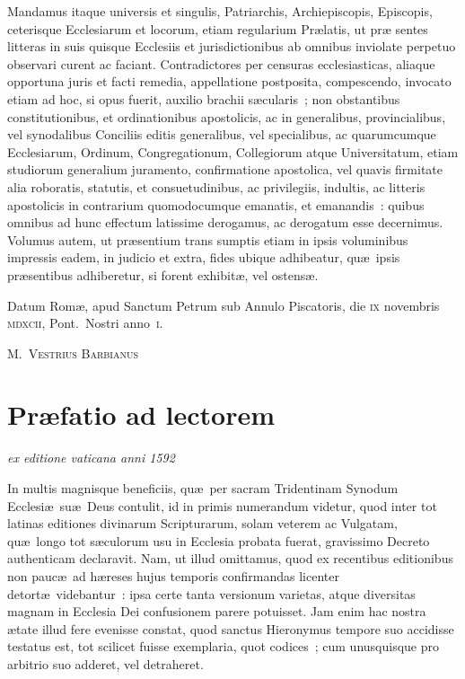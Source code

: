 Mandamus itaque universis et singulis, Patriarchis, Archiepiscopis, Episcopis, 
ceterisque Ecclesiarum et locorum, etiam regularium Pr\ae latis, ut pr\ae 
sentes litteras in suis quisque Ecclesiis et jurisdictionibus ab omnibus 
inviolate perpetuo observari curent ac faciant. Contradictores per censuras 
ecclesiasticas, aliaque opportuna juris et facti remedia, appellatione 
postposita, compescendo, invocato etiam ad hoc, si opus fuerit, auxilio brachii 
s\ae cularis~; non obstantibus constitutionibus, et ordinationibus apostolicis, 
ac in generalibus, provincialibus, vel synodalibus Conciliis editis 
generalibus, vel specialibus, ac quarumcumque Ecclesiarum, Ordinum, 
Congregationum, Collegiorum atque Universitatum, etiam studiorum generalium 
juramento, confirmatione apostolica, vel quavis firmitate alia roboratis, 
statutis, et consuetudinibus, ac privilegiis, indultis, ac litteris apostolicis 
in contrarium quomodocumque emanatis, et emanandis~: quibus omnibus ad hunc 
effectum latissime derogamus, ac derogatum esse decernimus. Volumus autem, ut 
pr\ae sentium trans sumptis etiam in ipsis voluminibus impressis eadem, in 
judicio et extra, fides ubique adhibeatur, qu\ae\ ipsis pr\ae sentibus 
adhiberetur, si forent exhibit\ae, vel ostens\ae. 

Datum Rom\ae, apud Sanctum Petrum sub Annulo Piscatoris, die \textsc{ix} 
novembris
\textsc{mdxcii}, Pont.\ Nostri anno~\textsc{i}.
\begin{flushright}\textsc{M.\ Vestrius Barbianus}\end{flushright}


\clearpage%
{\centering \section*{Pr\ae fatio ad lectorem}}
\begin{center}
\vspace{-9pt}\textit{ex editione vaticana anni 1592}
\end{center}

\noindent In multis magnisque beneficiis, qu\ae\ per sacram Tridentinam Synodum 
Ecclesi\ae\ su\ae\ Deus contulit, id in primis numerandum videtur, quod inter 
tot latinas editiones divinarum Scripturarum, solam veterem ac Vulgatam, qu\ae\ 
longo tot s\ae culorum usu in Ecclesia probata fuerat, gravissimo Decreto 
authenticam declaravit. Nam, ut illud omittamus, quod ex recentibus editionibus 
non pauc\ae\ ad h\ae reses hujus temporis confirmandas licenter detort\ae\ 
videbantur~: ipsa certe tanta versionum varietas, atque diversitas magnam in 
Ecclesia Dei confusionem parere potuisset. Jam enim hac nostra \ae tate illud 
fere evenisse constat, quod sanctus Hieronymus tempore suo accidisse testatus 
est, tot scilicet fuisse exemplaria, quot codices~; cum unusquisque pro arbitrio 
suo adderet, vel detraheret.


